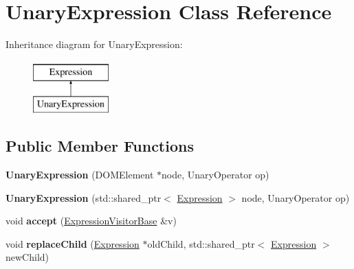 \hypertarget{class_unary_expression}{\section{Unary\+Expression Class Reference}
\label{class_unary_expression}
}
Inheritance diagram for Unary\+Expression\+:\begin{figure}[H]
\begin{center}
\leavevmode
\includegraphics[height=2.000000cm]{class_unary_expression}
\end{center}
\end{figure}
\subsection*{Public Member Functions}
\begin{DoxyCompactItemize}
\item 
\hypertarget{class_unary_expression_aca5476e9c2604e9d4a9d3f7bf5d8e024}{{\bfseries Unary\+Expression} (D\+O\+M\+Element $\ast$node, Unary\+Operator op)}\label{class_unary_expression_aca5476e9c2604e9d4a9d3f7bf5d8e024}

\item 
\hypertarget{class_unary_expression_a4a5ac8375de2f7bdf2e787bd4d19363c}{{\bfseries Unary\+Expression} (std\+::shared\+\_\+ptr$<$ \hyperlink{class_expression}{Expression} $>$ node, Unary\+Operator op)}\label{class_unary_expression_a4a5ac8375de2f7bdf2e787bd4d19363c}

\item 
\hypertarget{class_unary_expression_a34d44f441b84b899b832cbd46b4b7821}{void {\bfseries accept} (\hyperlink{class_expression_visitor_base}{Expression\+Visitor\+Base} \&v)}\label{class_unary_expression_a34d44f441b84b899b832cbd46b4b7821}

\item 
\hypertarget{class_unary_expression_ae1a0cfc5fbae6d401c28e8a3158121a3}{void {\bfseries replace\+Child} (\hyperlink{class_expression}{Expression} $\ast$old\+Child, std\+::shared\+\_\+ptr$<$ \hyperlink{class_expression}{Expression} $>$ new\+Child)}\label{class_unary_expression_ae1a0cfc5fbae6d401c28e8a3158121a3}

\end{DoxyCompactItemize}
